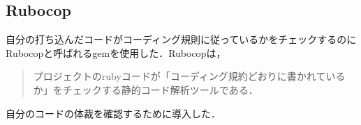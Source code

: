     \subsection{Rubocop}\label{rubocop}

自分の打ち込んだコードがコーディング規則に従っているかをチェックするのにRubocopと呼ばれるgemを使用した．Rubocopは，
\begin{quotation}
プロジェクトのrubyコードが「コーディング規約どおりに書かれているか」をチェックする静的コード解析ツールである\cite{rubocop}．
\end{quotation}
自分のコードの体裁を確認するために導入した．
